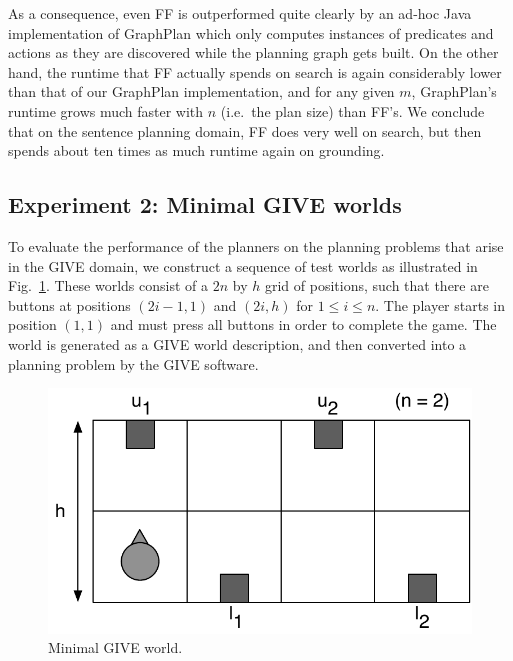 As a consequence, even FF is outperformed quite clearly by an ad-hoc
Java implementation of GraphPlan which only computes instances of
predicates and actions as they are discovered while the planning graph
gets built.  On the other hand, the runtime that FF actually spends on
search is again considerably lower than that of our GraphPlan
implementation, and for any given $m$, GraphPlan's runtime grows much
faster with $n$ (i.e.\ the plan size) than FF's.  We conclude that on
the sentence planning domain, FF does very well on search, but then
spends about ten times as much runtime again on grounding.



\subsection{Experiment 2: Minimal GIVE worlds}
\label{sec:exper-2:-minim}

To evaluate the performance of the planners on the planning problems
that arise in the GIVE domain, we construct a sequence of test worlds
as illustrated in Fig.~\ref{fig:give-minimal}.  These worlds consist
of a $2n$ by $h$ grid of positions, such that there are buttons at
positions $(2i-1,1)$ and $(2i,h)$ for $1 \leq i \leq n$.  The player
starts in position $(1,1)$ and must press all buttons in order to
complete the game.  The world is generated as a GIVE world
description, and then converted into a planning problem by the GIVE
software. 

\begin{figure}
  \centering
  \includegraphics[width=1\columnwidth]{pic-buttons}
  \caption{Minimal GIVE world.}
  \label{fig:give-minimal}
\end{figure}

